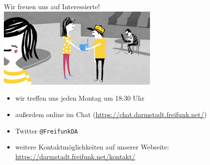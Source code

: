\documentclass[10pt]{beamer}
\begin{document}
  \begin{frame}{Wir freuen uns auf Interessierte!}
    \hspace{1em}\includegraphics[width=0.6\textwidth]{images/router}
    \begin{itemize}
      \item wir treffen uns jeden Montag um 18:30 Uhr
      \item außerdem online im Chat (\url{https://chat.darmstadt.freifunk.net/})
      \item Twitter \texttt{@FreifunkDA}
      \item weitere Kontaktmöglichkeiten auf unserer Webseite:\\
      \url{https://darmstadt.freifunk.net/kontakt/}
    \end{itemize}
  \end{frame}
\end{document}
